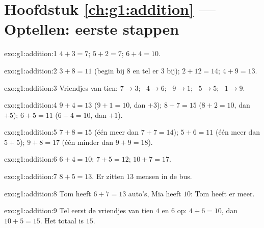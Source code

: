 \section*{Hoofdstuk \ref{ch:g1:addition} --- Optellen: eerste stappen}

\begin{solution}{exo:g1:addition:1}
$4 + 3 = 7$; \quad $5 + 2 = 7$; \quad $6 + 4 = 10$.
\end{solution}

\begin{solution}{exo:g1:addition:2}
$3 + 8 = 11$ (begin bij $8$ en tel er $3$ bij); \quad
$2 + 12 = 14$; \quad $4 + 9 = 13$.
\end{solution}

\begin{solution}{exo:g1:addition:3}
Vriendjes van tien: $7 \to 3$; \ $4 \to 6$; \ $9 \to 1$; \ $5 \to 5$;
\ $1 \to 9$.
\end{solution}

\begin{solution}{exo:g1:addition:4}
$9 + 4 = 13$ ($9 + 1 = 10$, dan $+3$); \quad
$8 + 7 = 15$ ($8 + 2 = 10$, dan $+5$); \quad
$6 + 5 = 11$ ($6 + 4 = 10$, dan $+1$).
\end{solution}

\begin{solution}{exo:g1:addition:5}
$7 + 8 = 15$ (één meer dan $7 + 7 = 14$); \quad
$5 + 6 = 11$ (één meer dan $5 + 5$); \quad
$9 + 8 = 17$ (één minder dan $9 + 9 = 18$).
\end{solution}

\begin{solution}{exo:g1:addition:6}
$6 + 4 = 10$; \quad $7 + 5 = 12$; \quad $10 + 7 = 17$.
\end{solution}

\begin{solution}{exo:g1:addition:7}
$8 + 5 = 13$. Er zitten $13$ mensen in de bus.
\end{solution}

\begin{solution}{exo:g1:addition:8}
Tom heeft $6 + 7 = 13$ auto's, Mia heeft $10$: Tom heeft er meer.
\end{solution}

\begin{solution}{exo:g1:addition:9}
Tel eerst de vriendjes van tien $4$ en $6$ op: $4 + 6 = 10$, dan
$10 + 5 = 15$. Het totaal is $15$.
\end{solution}
